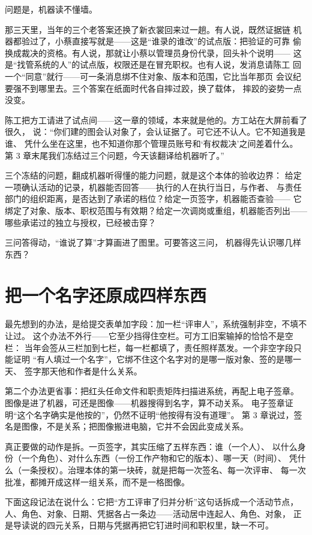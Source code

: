 问题是，机器读不懂墙。

那三天里，当年的三个老答案还换了新衣裳回来过一趟。有人说，既然证据链
机器都验过了，小蔡直接写就是——这是“谁录的谁改”的试点版：把验证的可靠
偷换成裁决的资格。有人说，那就让小蔡以管理员身份代录，回头补个说明——
这是“找管系统的人”的试点版，权限还是在冒充职权。也有人说，发消息请陈工
回一个“同意”就行——可一条消息绑不住对象、版本和范围，它比当年那页
会议纪要强不到哪里去。三个答案在纸面时代各自摔过跤，换了载体，
摔跤的姿势一点没变。

陈工把方工请进了试点间——这一章的领域，本来就是他的。方工站在大屏前看了很久，
说：“你们建的图会认对象了，会认证据了。可它还不认人。它不知道我是谁、
凭什么坐在这里，也不知道你那个管理员账号和‘有权裁决’之间差着什么。
第 3 章末尾我们冻结过三个问题，今天该翻译给机器听了。”

三个冻结的问题，翻成机器听得懂的能力问题，就是这个本体的验收边界：
给定一项确认活动的记录，机器能否回答——执行的人在执行当日，与作者、
与责任部门的组织距离，是否达到了承诺的档位？给定一页签字，机器能否查验——
它绑定了对象、版本、职权范围与有效期？给定一次调岗或重组，机器能否列出——
哪些承诺过的独立与授权，已经被击穿？

三问答得动，“谁说了算”才算画进了图里。可要答这三问，
机器得先认识哪几样东西？

\section{把一个名字还原成四样东西}

最先想到的办法，是给提交表单加字段：加一栏“评审人”，系统强制非空，不填不让过。
这个办法不外行——它至少挡得住空栏。可方工旧案输掉的恰恰不是空栏：
当年会签从三栏加到七栏，每一栏都填了，责任照样蒸发。一个非空字段只能证明
“有人填过一个名字”，它绑不住这个名字对的是哪一版对象、签的是哪一天、
签字那天他和作者是什么关系。

第二个办法更省事：把红头任命文件和职责矩阵扫描进系统，再配上电子签章。
图像是进了机器，可还是图像——机器搜得到名字，算不动关系。
电子签章证明“这个名字确实是他按的”，仍然不证明“他按得有没有道理”。
第 3 章说过，签名是图像，不是关系；把图像搬进电脑，它并不会因此变成关系。

真正要做的动作是拆。一页签字，其实压缩了五样东西：谁（一个人）、
以什么身份（一个角色）、对什么东西（一份工作产物和它的版本）、哪一天（时间）、
凭什么（一条授权）。治理本体的第一块砖，就是把每一次签名、每一次评审、
每一次批准，都摊开成这样一组关系，而不是一格图像。

下面这段记法在说什么：它把“方工评审了归并分析”这句话拆成一个活动节点，
人、角色、对象、日期、凭据各占一条边——活动居中连起人、角色、对象，
正是导读说的四元关系，日期与凭据再把它钉进时间和职权里，缺一不可。

